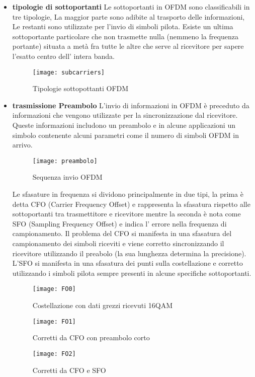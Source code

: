 \begin{itemize}
 \item \textbf{tipologie di sottoportanti}
 Le sottoportanti in OFDM sono classificabili in tre tipologie, La maggior parte sono adibite al trasporto delle informazioni, Le restanti sono utilizzate per l'invio di simboli pilota. Esiste un ultima sottoportante particolare che non trasmette nulla (nemmeno la frequenza portante) situata a metà fra tutte le altre che serve al ricevitore per sapere l'esatto centro dell' intera banda.
 \begin{figure}[h]
 	\centering
 	\texttt{[image: subcarriers]}
 	\caption{Tipologie sottopottanti OFDM \cite{subcarriers}}\label{fig:1}
 \end{figure}
 \item \textbf{trasmissione Preambolo}
	L'invio di informazioni in OFDM è preceduto da informazioni che vengono utilizzate per la sincronizzazione dal ricevitore. Queste informazioni includono un preambolo e in alcune applicazioni un simbolo contenente alcuni parametri come il numero di simboli OFDM in arrivo.
	\begin{figure}[h]
		\centering
		\texttt{[image: preambolo]}
		\caption{Sequenza invio OFDM \cite{subcarriers}}\label{fig:1}
	\end{figure}
 
  Le sfasature in frequenza si dividono principalmente in due tipi, la prima è detta CFO (Carrier Frequency Offset) e rappresenta la sfasatura rispetto alle sottoportanti tra trasmettitore e ricevitore mentre la seconda è nota come SFO (Sampling Frequency Offset) e indica l' errore nella frequenza di campionamento. Il problema del CFO si manifesta in una sfasatura del campionamento dei simboli riceviti e viene corretto sincronizzando il ricevitore utilizzando il preabolo (la sua lunghezza determina la precisione). L'SFO si manifesta in una sfasatura dei punti sulla costellazione e corretto utilizzando i simboli pilota sempre presenti in alcune specifiche sottoportanti. \cite{FOOFDM}

\begin{figure}[h]
	\centering
	\begin{minipage}[b]{.30\columnwidth}
		\texttt{[image: FO0]}
		\caption{Costellazione con dati grezzi ricevuti 16QAM}\label{fig:1}
	\end{minipage}\hfill
	\begin{minipage}[b]{.30\columnwidth}
		\texttt{[image: FO1]}
		\caption{Corretti da CFO con preambolo corto}\label{fig:1}
	\end{minipage}\hfill
	\begin{minipage}[b]{.30\columnwidth}
		\texttt{[image: FO2]}
		\caption{Corretti da CFO e SFO}\label{fig:1}
	\end{minipage}\hfill
	\cite{FOOFDM}
	\end{figure}
	

\end{itemize}
